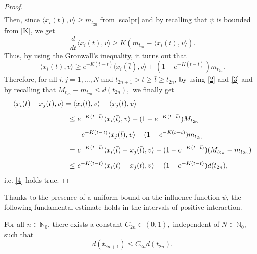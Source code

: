 \documentclass[a4paper,11pt,oneside]{article}
\begin{document}
\begin{proof}
$$\begin{array}{l}
		\end{array}
		$$
		Then, since $\langle x_{i}(t),v\rangle\geq m_{t_{2n}}$ from \eqref{scalpr} and by recalling that $\psi$ is bounded from \eqref{K}, we get $$\frac{d}{dt}\langle x_{i}(t),v\rangle\geq K(m_{t_{2n}}-\langle x_{i}(t),v\rangle).$$
		Thus, by using the Gronwall's inequality, it turns out that
		\begin{equation}\label{3}
				\langle x_{i}(t),v\rangle\geq e^{-K(t-\bar{t})}\langle x_{i}(\bar{t}),v\rangle+(1-e^{-K(t-\bar{t})})m_{t_{2n}}.
		\end{equation}
		Therefore, for all $i,j=1,\dots,N$ and $t_{2n+1}>t\geq \bar{t}\geq t_{2n}$, by using \eqref{2} and \eqref{3} and by recalling that $M_{t_{2n}}-m_{t_{2n}}\leq d(t_{2n}),$ we finally get 
		$$
		\begin{array}{l}
			\vspace{0.3cm}\displaystyle{\langle x_{i}(t)-x_{j}(t),v\rangle=\langle x_{i}(t),v\rangle-\langle x_{j}(t),v\rangle}\\
			\vspace{0.3cm}\displaystyle{\hspace{2.8 cm}\leq e^{-K(t-\bar{t})}\langle x_{i}(\bar{t}),v\rangle+(1-e^{-K(t-\bar{t})})M_{t_{2n}}}\\
			\vspace{0.3cm}\displaystyle{\hspace{3.1 cm}-e^{-K(t-\bar{t})}\langle x_{j}(\bar{t}),v\rangle-(1-e^{-K(t-\bar{t})})m_{t_{2n}}}\\
			\vspace{0.3cm}\displaystyle{\hspace{2.8 cm}=e^{-K(t-\bar{t})}\langle x_{i}(\bar{t})-x_{j}(\bar{t}),v\rangle+(1-e^{-K(t-\bar{t})})(M_{t_{2n}}-m_{t_{2n}})}\\
			\displaystyle{\hspace{2.8 cm}\leq e^{-K(t-\bar{t})}\langle x_{i}(\bar{t})-x_{j}(\bar{t}),v\rangle+(1-e^{-K(t-\bar{t})})d(t_{2n}),}
		\end{array}
		$$
		i.e. \eqref{4} holds true.
	\end{proof}
	Thanks to the presence of a uniform bound on the influence function $\psi$, the following fundamental estimate holds in the intervals of positive interaction.
	\begin{prop}\label{L5}
		For all $n\in \mathbb{N}_{0}$, there exists a constant $C_{2n}\in (0,1),$ independent of $N\in\mathbb{N}_0,$ such that
		\begin{equation}\label{n-2}
			d(t_{2n+1})\leq C_{2n} d(t_{2n}).
		\end{equation}
	\end{prop}
\end{document}
